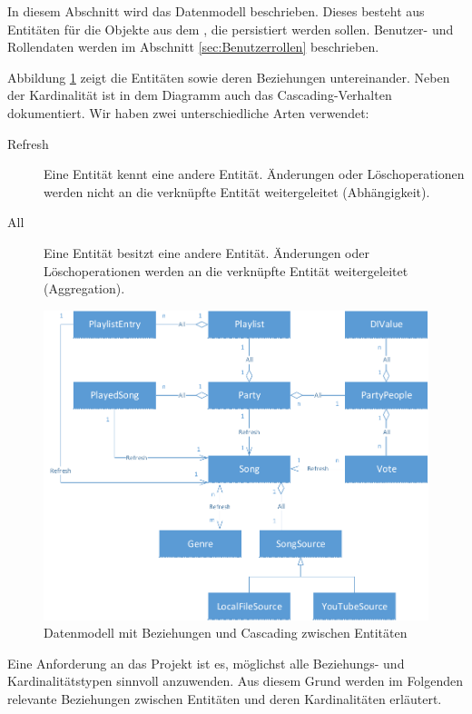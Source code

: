 In diesem Abschnitt wird das Datenmodell beschrieben. Dieses besteht aus Entitäten für die Objekte aus dem , die persistiert werden sollen. Benutzer- und Rollendaten werden im Abschnitt \ref{sec:Benutzerrollen} beschrieben.

Abbildung \ref{fig:Datenmodell} zeigt die Entitäten sowie deren Beziehungen untereinander. Neben der Kardinalität ist in dem Diagramm auch das Cascading-Verhalten dokumentiert. Wir haben zwei unterschiedliche Arten verwendet:
\begin{description}
	\item[Refresh] Eine Entität kennt eine andere Entität. Änderungen oder Löschoperationen werden nicht an die verknüpfte Entität weitergeleitet (Abhängigkeit).
	\item[All] Eine Entität besitzt eine andere Entität. 
	Änderungen oder Löschoperationen werden an die 
	verknüpfte Entität weitergeleitet (Aggregation).
\end{description}

\vspace{8pt}
\begin{figure}[htb]
\centering
\includegraphics[width=1\linewidth]{Bilder/Datenmodell}
\caption{Datenmodell mit Beziehungen und Cascading zwischen Entitäten}
\label{fig:Datenmodell}
\end{figure}

Eine Anforderung an das Projekt ist es, möglichst alle Beziehungs- und Kardinalitätstypen sinnvoll anzuwenden. Aus diesem Grund werden im Folgenden relevante Beziehungen zwischen Entitäten und deren Kardinalitäten erläutert.

